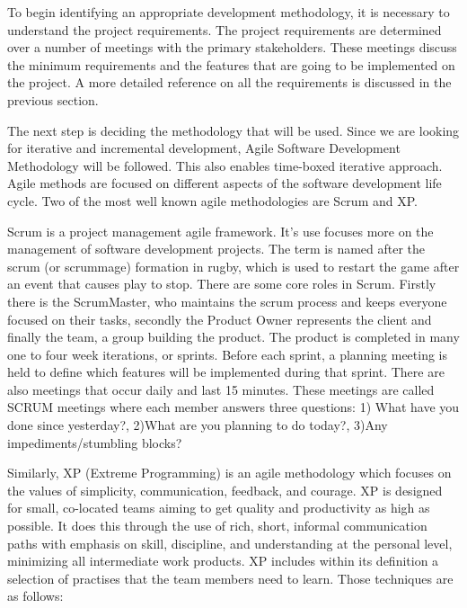 To begin identifying an appropriate development methodology, it is necessary to understand the project requirements. The project requirements are determined over a number of meetings with the primary stakeholders. These meetings discuss the minimum requirements and the features that are going to be implemented on the project. A more detailed reference on all the requirements is discussed in the previous section.

The next step is deciding the methodology that will be used. Since we are looking for iterative and incremental development, Agile Software Development Methodology will be followed. This also enables time-boxed iterative approach. Agile methods are focused on different aspects of the software development life cycle. Two of the most well known agile methodologies are Scrum and XP.

Scrum is a project management agile framework. It's use focuses more on the management of software development projects. The term is named after the scrum (or scrummage) formation in rugby, which is used to restart the game after an event that causes play to stop. There are some core roles in Scrum. Firstly there is the ScrumMaster, who maintains the scrum process and keeps everyone focused on their tasks, secondly the Product Owner represents the client and finally the team, a group building the product. The product is completed in many one to four week iterations, or sprints. Before each sprint, a planning meeting is held to define which features will be implemented during that sprint. There are also meetings that occur daily and last 15 minutes. These meetings are called SCRUM meetings where each member answers three questions: 1) What have you done since yesterday?, 2)What are you planning to do today?, 3)Any impediments/stumbling blocks?

Similarly, XP (Extreme Programming) is an agile methodology which focuses on the values of simplicity, communication, feedback, and courage. XP is designed for small, co-located teams aiming to get quality and productivity as high as possible. It does this through the use of rich, short, informal communication paths with emphasis on skill, discipline, and understanding at the personal level, minimizing all intermediate work products. XP includes within its definition a selection of practises that the team members need to learn. Those techniques are as follows:

